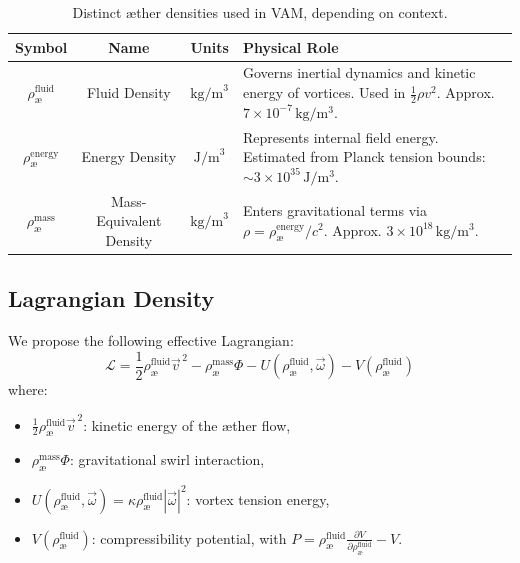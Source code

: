 \documentclass[12pt]{article}
\begin{document}
\begin{table}[H]
\centering
\footnotesize
\renewcommand{\arraystretch}{1.3}
\begin{tabular}{|c|c|c|p{7.5cm}|}
\hline
\textbf{Symbol} & \textbf{Name} & \textbf{Units} & \textbf{Physical Role} \\
\hline
\( \rho_\text{\ae}^{\text{fluid}} \) & Fluid Density & \( \mathrm{kg/m}^3 \) & Governs inertial dynamics and kinetic energy of vortices. Used in \( \frac{1}{2} \rho v^2 \). Approx. \( 7 \times 10^{-7} \, \mathrm{kg/m^3} \). \\
\hline
\( \rho_\text{\ae}^{\text{energy}} \) & Energy Density & \( \mathrm{J/m}^3 \) & Represents internal field energy. Estimated from Planck tension bounds: \( \sim 3 \times 10^{35} \, \mathrm{J/m^3} \). \\
\hline
\( \rho_\text{\ae}^{\text{mass}} \) & Mass-Equivalent Density & \( \mathrm{kg/m}^3 \) & Enters gravitational terms via \( \rho = \rho_\text{\ae}^{\text{energy}}/c^2 \). Approx. \( 3 \times 10^{18} \, \mathrm{kg/m^3} \). \\
\hline
\end{tabular}
\caption{Distinct æther densities used in VAM, depending on context.}
\label{tab:ae_densities}
\end{table}

\subsection{Lagrangian Density}
We propose the following effective Lagrangian:
\begin{equation}
    \mathcal{L} = \frac{1}{2} \rho_\text{\ae}^{\text{fluid}} \vec{v}^{\,2} - \rho_\text{\ae}^{\text{mass}} \Phi - U(\rho_\text{\ae}^{\text{fluid}}, \vec{\omega}) - V(\rho_\text{\ae}^{\text{fluid}})
\end{equation}
where:
\begin{itemize}
    \item $\frac{1}{2} \rho_\text{\ae}^{\text{fluid}} \vec{v}^{\,2}$: kinetic energy of the æther flow,
    \item $\rho_\text{\ae}^{\text{mass}} \Phi$: gravitational swirl interaction,
    \item $U(\rho_\text{\ae}^{\text{fluid}}, \vec{\omega}) = \kappa \rho_\text{\ae}^{\text{fluid}} |\vec{\omega}|^2$: vortex tension energy,
    \item $V(\rho_\text{\ae}^{\text{fluid}})$: compressibility potential, with $P = \rho_\text{\ae}^{\text{fluid}} \frac{\partial V}{\partial \rho_\text{\ae}^{\text{fluid}}} - V$.
\end{itemize}
\end{document}
